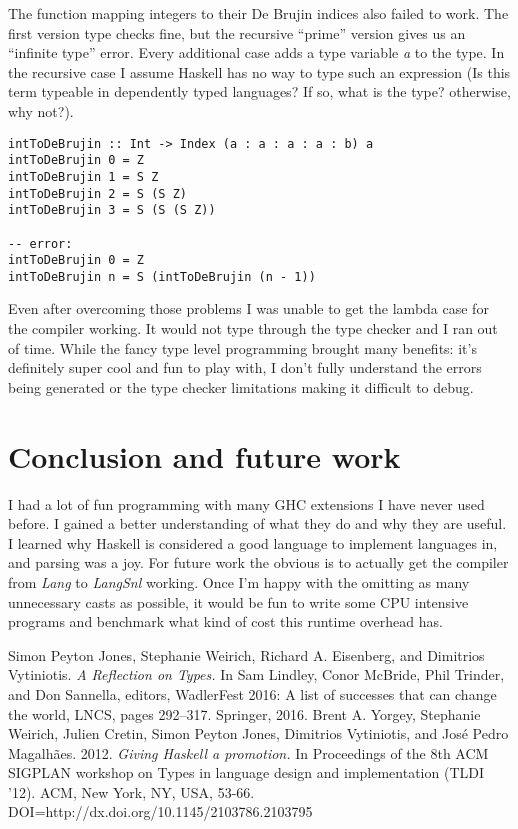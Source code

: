 \documentclass{article}
\begin{document}
The function mapping integers to their De Brujin indices also failed to work. The first version type checks fine, but the recursive ``prime'' version gives us an ``infinite type'' error. Every additional case adds a type variable \textit{a} to the type. In the recursive case I assume Haskell has no way to type such an expression (Is this term typeable in dependently typed languages? If so, what is the type? otherwise, why not?).
\begin{verbatim}
intToDeBrujin :: Int -> Index (a : a : a : a : b) a
intToDeBrujin 0 = Z
intToDeBrujin 1 = S Z
intToDeBrujin 2 = S (S Z)
intToDeBrujin 3 = S (S (S Z))

-- error:
intToDeBrujin 0 = Z
intToDeBrujin n = S (intToDeBrujin (n - 1))
\end{verbatim}

Even after overcoming those problems I was unable to get the lambda case for the compiler working. It would not type through the type checker and I ran out of time. While the fancy type level programming brought many benefits: it's definitely super cool and fun to play with, I don't fully understand the errors being generated or the type checker limitations making it difficult to debug.

\section*{Conclusion and future work}
I had a lot of fun programming with many GHC extensions I have never used before. I gained a better understanding of what they do and why they are useful. I learned why Haskell is considered a good language to implement languages in, and parsing was a joy. For future work the obvious is to actually get the compiler from \textit{Lang} to \textit{LangSnl} working. Once I'm happy with the omitting as many unnecessary casts as possible, it would be fun to write some CPU intensive programs and benchmark what kind of cost this runtime overhead has.

\begin{thebibliography}{1}
 Simon Peyton Jones, Stephanie Weirich, Richard A. Eisenberg, and Dimitrios Vytiniotis. {\em A Reflection on Types. } In Sam Lindley, Conor McBride, Phil Trinder, and Don Sannella, editors, WadlerFest 2016: A list of successes that can change the world, LNCS, pages 292--317. Springer, 2016.
  Brent A. Yorgey, Stephanie Weirich, Julien Cretin, Simon Peyton Jones, Dimitrios Vytiniotis, and José Pedro Magalhães. 2012. {\em Giving Haskell a promotion. }In Proceedings of the 8th ACM SIGPLAN workshop on Types in language design and implementation (TLDI '12). ACM, New York, NY, USA, 53-66. DOI=http://dx.doi.org/10.1145/2103786.2103795
\end{thebibliography}
\end{document}
